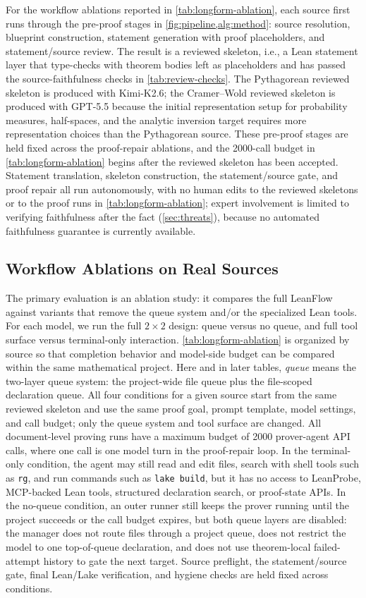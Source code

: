 \documentclass{article}
\newcommand{\method}{LeanFlow\xspace}
\newcommand{\kimi}{Kimi-K2.6\xspace}
\newcommand{\gpt}{GPT-5.5\xspace}
\newcommand{\lean}{Lean\xspace}
\begin{document}
For the workflow ablations reported in \cref{tab:longform-ablation}, each source first runs through the pre-proof stages in \cref{fig:pipeline,alg:method}: source resolution, blueprint construction, statement generation with proof placeholders, and statement/source review.
The result is a reviewed skeleton, i.e., a \lean statement layer that type-checks with theorem bodies left as placeholders and has passed the source-faithfulness checks in \cref{tab:review-checks}.
The Pythagorean reviewed skeleton is produced with \kimi; the Cramer--Wold reviewed skeleton is produced with \gpt because the initial representation setup for probability measures, half-spaces, and the analytic inversion target requires more representation choices than the Pythagorean source.
These pre-proof stages are held fixed across the proof-repair ablations, and the 2000-call budget in \cref{tab:longform-ablation} begins after the reviewed skeleton has been accepted.
Statement translation, skeleton construction, the statement/source gate, and proof repair all run autonomously, with no human edits to the reviewed skeletons or to the proof runs in \cref{tab:longform-ablation}; expert involvement is limited to verifying faithfulness after the fact (\cref{sec:threats}), because no automated faithfulness guarantee is currently available.

\subsection{Workflow Ablations on Real Sources}

The primary evaluation is an ablation study: it compares the full \method against variants that remove the queue system and/or the specialized \lean tools.
For each model, we run the full $2\times2$ design: queue versus no queue, and full tool surface versus terminal-only interaction. \cref{tab:longform-ablation} is organized by source so that completion behavior and model-side budget can be compared within the same mathematical project.
Here and in later tables, \emph{queue} means the two-layer queue system: the project-wide file queue plus the file-scoped declaration queue.
All four conditions for a given source start from the same reviewed skeleton and use the same proof goal, prompt template, model settings, and call budget; only the queue system and tool surface are changed.
All document-level proving runs have a maximum budget of 2000 prover-agent API calls, where one call is one model turn in the proof-repair loop.
In the terminal-only condition, the agent may still read and edit files, search with shell tools such as \texttt{rg}, and run commands such as \texttt{lake build}, but it has no access to LeanProbe, MCP-backed \lean tools, structured declaration search, or proof-state APIs.
In the no-queue condition, an outer runner still keeps the prover running until the project succeeds or the call budget expires, but both queue layers are disabled: the manager does not route files through a project queue, does not restrict the model to one top-of-queue declaration, and does not use theorem-local failed-attempt history to gate the next target.
Source preflight, the statement/source gate, final \lean/Lake verification, and hygiene checks are held fixed across conditions.
\end{document}
